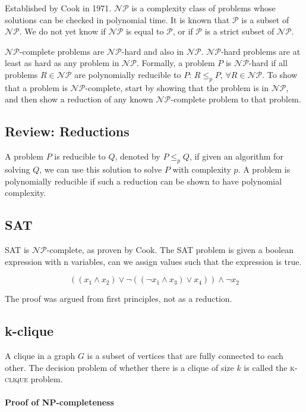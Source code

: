 \documentclass{idc_msc}
\newcommand{\NPclass}{\mathcal{NP}}
\newcommand{\Pclass}{\mathcal{P}}
\begin{document}
Established by Cook in 1971\cite{cook1971complexity}. \(\NPclass\) is a complexity class of problems whose solutions can be checked in polynomial time.
It is known that \(\Pclass\) is a subset of \(\NPclass\). We do not yet know if \(\NPclass\) is equal to \(\Pclass\), or if \(\Pclass\) is a strict subset of \(\NPclass\).

\(\NPclass\)-complete problems are \(\NPclass\)-hard and also in \(\NPclass\).
\(\NPclass\)-hard problems are at least as hard as any problem in \(\NPclass\).
Formally, a problem \(P\) is \(\NPclass\)-hard if all problems \(R \in \NPclass\) are polynomially reducible to \(P\): \(R \le_p P,\, \forall R \in \NPclass\).
To show that a problem is \(\NPclass\)-complete, start by showing that the problem is in \(\NPclass\), and then show a reduction of any known \(\NPclass\)-complete problem to that problem.

\subsection{Review: Reductions}

A problem \(P\) is reducible to \(Q\), denoted by \(P \le_p Q\), if given an algorithm for solving \(Q\), we can use this solution to solve \(P\) with complexity \(p\).
A problem is polynomially reducible if such a reduction can be shown to have polynomial complexity.

\subsection{SAT}

\textsc{SAT} is \(\NPclass\)-complete, as proven by Cook.
The \textsc{SAT} problem is given a boolean expression with n variables, can we assign values such that the expression is true.

\[
( (x_1 \land x_2) \lor \lnot ( (\lnot x_1 \land x_3 ) \lor x_4)) \land \lnot x_2
\]

The proof was argued from first principles, not as a reduction.

\subsection{k-clique}

A clique in a graph \(G\) is a subset of vertices that are fully connected to each other.
The decision problem of whether there is a clique of size \(k\) is called the \textsc{k-clique} problem.

\paragraph{Proof of NP-completeness}
\end{document}
